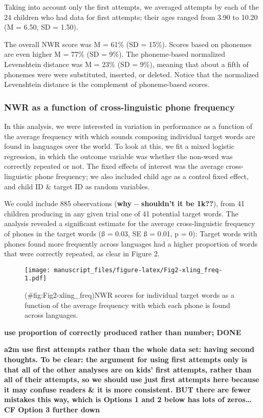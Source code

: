 \documentclass[english,,man,floatsintext]{apa6}
\begin{document}
Taking into account only the first attempts, we averaged attempts by
each of the 24 children who had data for first attempts; their ages
ranged from 3.90 to 10.20 (M = 6.50, SD = 1.50).

The overall NWR score was M = 61\% (SD = 15\%). Scores based on phonemes
are even higher M = 77\% (SD = 9\%). The phoneme-based normalized
Levenshtein distance was M = 23\% (SD = 9\%), meaning that about a fifth
of phonemes were were substituted, inserted, or deleted. Notice that the
normalized Levenshtein distance is the complement of phoneme-based
scores.

\subsubsection{NWR as a function of cross-linguistic phone
frequency}\label{nwr-as-a-function-of-cross-linguistic-phone-frequency}

In this analysis, we were interested in variation in performance as a
function of the average frequency with which sounds composing individual
target words are found in languages over the world. To look at this, we
fit a mixed logistic regression, in which the outcome variable was
whether the non-word was correctly repeated or not. The fixed effects of
interest was the average cross-linguistic phone frequency; we also
included child age as a control fixed effect, and child ID \& target ID
as random variables.

We could include 885 observations (\textbf{why -- shouldn't it be
1k??}), from 41 children producing in any given trial one of 41
potential target words. The analysis revealed a significant estimate for
the average cross-linguistic frequency of phones in the target words (ß
= 0.03, SE ß = 0.01, p = 0): Target words with phones found more
frequently across languages had a higher proportion of words that were
correctly repeated, as clear in Figure 2.

\begin{figure}
\centering
\texttt{[image: manuscript\_files/figure-latex/Fig2-xling\_freq-1.pdf]}
\caption{(\#fig:Fig2-xling\_freq)NWR scores for individual target words
as a function of the average frequency with which each phone is found
across languages.}
\end{figure}

\textbf{use proportion of correctly produced rather than number; DONE}

\textbf{a2m use first attempts rather than the whole data set: having
second thoughts. To be clear: the argument for using first attempts only
is that all of the other analyses are on kids' first attempts, rather
than all of their attempts, so we should use just first attempts here
because it may confuse readers \& it is more consistent. BUT there are
fewer mistakes this way, which is Options 1 and 2 below has lots of
zeros\ldots{} CF Option 3 further down}
\end{document}
